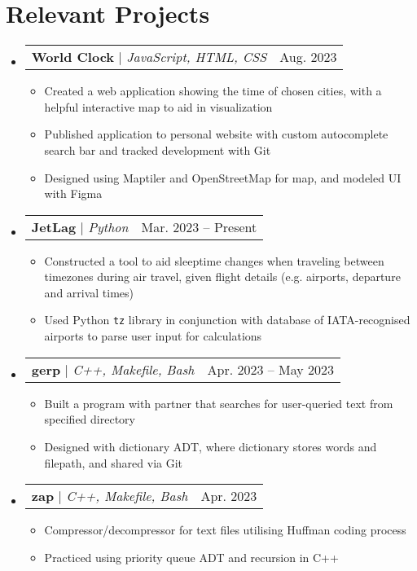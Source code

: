 \documentclass[letterpaper,11pt]{article}
\makeatletter
\newcommand{\resumeItem}[1]{
  \item\small{
    {#1 \vspace{-2pt}}
  }
}
\newcommand{\resumeProjectHeading}[2]{
    \item
    \begin{tabular*}{0.97\textwidth}{l@{\extracolsep{\fill}}r}
      \small#1 & #2 \\
    \end{tabular*}\vspace{-7pt}
}
\newcommand{\resumeSubHeadingListStart}{\begin{itemize}[leftmargin=0.15in, label={}]}
\newcommand{\resumeSubHeadingListEnd}{\end{itemize}}
\newcommand{\resumeItemListStart}{\begin{itemize}}
\newcommand{\resumeItemListEnd}{\end{itemize}\vspace{-5pt}}
\makeatother
\begin{document}
\section{Relevant Projects}
    \resumeSubHeadingListStart
      \resumeProjectHeading
          {\textbf{World Clock} $|$ \emph{JavaScript, HTML, CSS}}{Aug. 2023}
          \resumeItemListStart
            \resumeItem{Created a web application showing the time of chosen cities, with a helpful interactive map to aid in visualization}
            \resumeItem{Published application to personal website with custom autocomplete search bar and tracked development with Git}
            \resumeItem{Designed using Maptiler and OpenStreetMap for map, and modeled UI with Figma}
          \resumeItemListEnd
      \resumeProjectHeading
          {\textbf{JetLag} $|$ \emph{Python}}{Mar. 2023 – Present}
          \resumeItemListStart
            \resumeItem{Constructed a tool to aid sleeptime changes when traveling between timezones during air travel,
            given flight details (e.g. airports, departure and arrival
            times)}
            \resumeItem{Used Python \texttt{tz} library in conjunction with database of
            IATA-recognised airports to parse user input for calculations}
          \resumeItemListEnd

      \resumeProjectHeading
          {\textbf{gerp} $|$ \emph{C++, Makefile, Bash}}{Apr. 2023 – May 2023}
          \resumeItemListStart
            \resumeItem{Built a program with partner that searches for user-queried text from specified directory}
            \resumeItem{Designed with dictionary ADT, where dictionary stores words and filepath, and shared via Git}
          \resumeItemListEnd
          \resumeProjectHeading
          {\textbf{zap} $|$ \emph{C++, Makefile, Bash}}{Apr. 2023}
          \resumeItemListStart
            \resumeItem{Compressor/decompressor for text files utilising Huffman coding process}
            \resumeItem{Practiced using priority queue ADT and recursion in C++}
          \resumeItemListEnd
    \resumeSubHeadingListEnd
\end{document}
